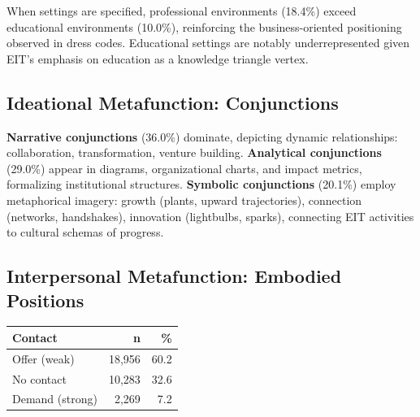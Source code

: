 \documentclass[../main.tex]{subfiles}
\begin{document}
When settings are specified, professional environments (18.4\%) exceed educational environments (10.0\%), reinforcing the business-oriented positioning observed in dress codes. Educational settings are notably underrepresented given EIT's emphasis on education as a knowledge triangle vertex.

\subsection{Ideational Metafunction: Conjunctions}


\textbf{Narrative conjunctions} (36.0\%) dominate, depicting dynamic relationships: collaboration, transformation, venture building. \textbf{Analytical conjunctions} (29.0\%) appear in diagrams, organizational charts, and impact metrics, formalizing institutional structures. \textbf{Symbolic conjunctions} (20.1\%) employ metaphorical imagery: growth (plants, upward trajectories), connection (networks, handshakes), innovation (lightbulbs, sparks), connecting EIT activities to cultural schemas of progress.

\subsection{Interpersonal Metafunction: Embodied Positions}

\begin{center}
\small
\begin{tabular}{lrr}
\toprule
\textbf{Contact} & \textbf{n} & \textbf{\%} \\
\midrule
Offer (weak) & 18,956 & 60.2 \\
No contact & 10,283 & 32.6 \\
Demand (strong) & 2,269 & 7.2 \\
\bottomrule
\end{tabular}
\end{center}
\end{document}
